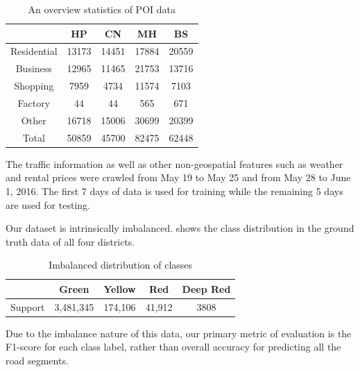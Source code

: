 \begin{table}[th]
	\centering
	\caption{An overview statistics of POI data}
	\label{tbl:poistats}
	\begin{tabular}{|c|c|c|c|c|}
		\hline
		& HP & CN & MH & BS \\ \hline \hline
		Residential & 13173   & 14451     & 17884   & 20559   \\ \hline
		Business    & 12965   & 11465     & 21753   & 13716   \\ \hline
		Shopping    & 7959    & 4734      & 11574   & 7103    \\ \hline
		Factory     & 44      & 44        & 565     & 671     \\ \hline
		Other       & 16718   & 15006     & 30699   & 20399   \\ \hline
		Total       & 50859   & 45700     & 82475   & 62448   \\ \hline
	\end{tabular}
\end{table}

The traffic information as well as other non-geospatial features such as weather and rental prices were crawled from May 19 to May 25 and from May 28 to June 1, 2016. The first 7 days of data is used for training while
the remaining 5 days are used for testing.

Our dataset is intrinsically imbalanced.  shows the 
class distribution in the ground truth data of all four districts.

\begin{table}[th]
\centering
\caption{Imbalanced distribution of classes}
\label{tab:imbal}
\begin{tabular}{|c|c|c|c|c|} \hline
 & Green & Yellow & Red & Deep Red \\ \hline
Support & 3,481,345 & 174,106 & 41,912 & 3808 \\ \hline
\end{tabular}
\end{table}

Due to the imbalance nature of this data, our primary metric of
evaluation is the F1-score for each class label, rather than
overall accuracy for predicting all the road segments.
 
